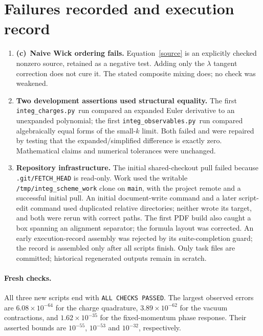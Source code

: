 \documentclass[11pt,a4paper]{article}
\newcommand{\C}{\textbf{(c)}\ }
\newcommand{\file}[1]{\nolinkurl{#1}}
\newcommand{\chg}{\file{integ_charges.py}}
\newcommand{\obs}{\file{integ_observables.py}}
\begin{document}
\section{Failures recorded and execution record}
\begin{enumerate}
\item \C \textbf{Naive Wick ordering fails.} Equation~\eqref{source}
is an explicitly checked nonzero source, retained as a negative test.
Adding only the $\lambda$ tangent correction does not cure it. The stated
composite mixing does; no check was weakened.
\item \textbf{Two development assertions used structural equality.}
The first \chg\ run compared an expanded Euler derivative to an
unexpanded polynomial; the first \obs\ run compared algebraically equal
forms of the small-$k$ limit. Both failed and were repaired by testing
that the expanded/simplified difference is exactly zero. Mathematical
claims and numerical tolerances were unchanged.
\item \textbf{Repository infrastructure.} The initial shared-checkout pull
failed because \file{.git/FETCH\_HEAD} is read-only. Work used the writable
\file{/tmp/integ_scheme_work} clone on \file{main}, with the project remote
and a successful initial pull. An initial document-write command and a later script-edit command used
duplicated relative directories; neither wrote its target, and both were
rerun with correct paths. The first PDF build also caught a box
spanning an alignment separator; the formula layout was corrected. An early execution-record assembly was
rejected by its suite-completion guard; the record is assembled only after
all scripts finish. Only task files are committed;
historical regenerated outputs remain in scratch.
\end{enumerate}
\paragraph{Fresh checks.}
All three new scripts end with \texttt{ALL CHECKS PASSED}. The largest
observed errors are $6.08\times10^{-64}$ for the charge quadrature,
$3.89\times10^{-62}$ for the vacuum contractions, and
$1.62\times10^{-35}$ for the fixed-momentum phase response. Their asserted
bounds are $10^{-55}$, $10^{-53}$ and $10^{-32}$, respectively.
\end{document}
